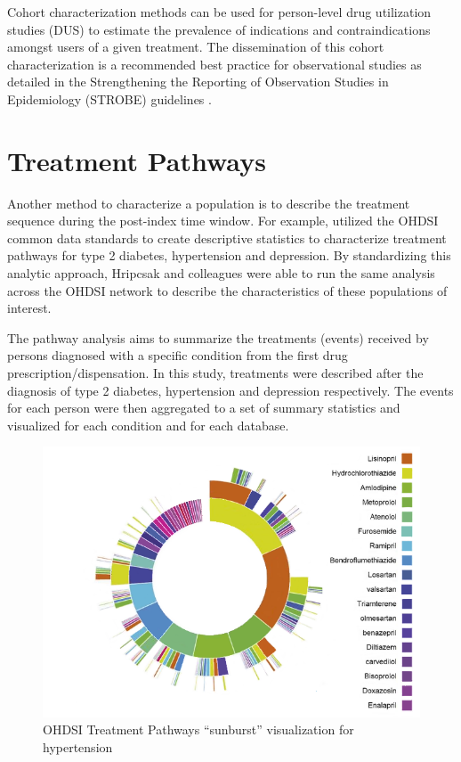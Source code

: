 \documentclass[11pt]{book}
\theoremstyle{definition}
\theoremstyle{definition}
\theoremstyle{definition}
\theoremstyle{remark}
\begin{document}
Cohort characterization methods can be used for person-level drug utilization studies (DUS) to estimate the prevalence of indications and contraindications amongst users of a given treatment. The dissemination of this cohort characterization is a recommended best practice for observational studies as detailed in the Strengthening the Reporting of Observation Studies in Epidemiology (STROBE) guidelines \citep{VONELM2008344}.   

\hypertarget{treatment-pathways}{%
\section{Treatment Pathways}\label{treatment-pathways}}

Another method to characterize a population is to describe the treatment sequence during the post-index time window. For example, \citet{Hripcsak7329} utilized the OHDSI common data standards to create descriptive statistics to characterize treatment pathways for type 2 diabetes, hypertension and depression. By standardizing this analytic approach, Hripcsak and colleagues were able to run the same analysis across the OHDSI network to describe the characteristics of these populations of interest.   

The pathway analysis aims to summarize the treatments (events) received by persons diagnosed with a specific condition from the first drug prescription/dispensation. In this study, treatments were described after the diagnosis of type 2 diabetes, hypertension and depression respectively. The events for each person were then aggregated to a set of summary statistics and visualized for each condition and for each database.

\begin{figure}

{\centering \includegraphics[width=0.9\linewidth]{images/Characterization/pnasTreatmentPathwaysSunburst} 

}

\caption{OHDSI Treatment Pathways “sunburst” visualization for hypertension}\label{fig:treatmentPathwaysSunburstDataViz}
\end{figure}
\end{document}
